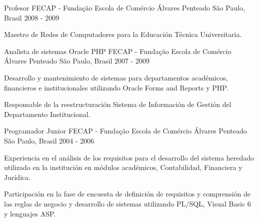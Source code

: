 \begin{cventries}
  \cventry
    {Profesor} %
    {FECAP - Fundação Escola de Comércio Álvares Penteado} %
    {São Paulo, Brasil} %
    {2008 - 2009} %
    {
      \begin{cvitems} %
        \item {Maestro de Redes de Computadores para la Educación Técnica Universitaria.}
      \end{cvitems}
    }

  \cventry
    {Analista de sistemas Oracle PHP} %
    {FECAP - Fundação Escola de Comércio Álvares Penteado} %
    {São Paulo, Brasil} %
    {2007 - 2009} %
    {
      \begin{cvitems} %
        \item {Desarrollo y mantenimiento de sistemas para departamentos académicos, financieros e institucionales utilizando Oracle Forms and Reports y PHP.}
       \item{Responsable de la reestructuración Sistema de Información de Gestión del Departamento Institucional.}
      \end{cvitems}
    }

  \cventry
    {Programador Junior} %
    {FECAP - Fundação Escola de Comércio Álvares Penteado} %
    {São Paulo, Brasil} %
    {2004 - 2006} %
    {
      \begin{cvitems} %
        \item {Experiencia en el análisis de los requisitos para el desarrollo del sistema heredado utilizado en la institución en módulos académicos, Contabilidad, Financiera y Jurídica.}
        \item {Participación en la fase de encuesta de definición de requisitos y comprensión de las reglas de negocio y desarrollo de sistemas utilizando PL/SQL, Visual Basic 6 y lenguajes ASP.}
      \end{cvitems}
    }


\end{cventries}
